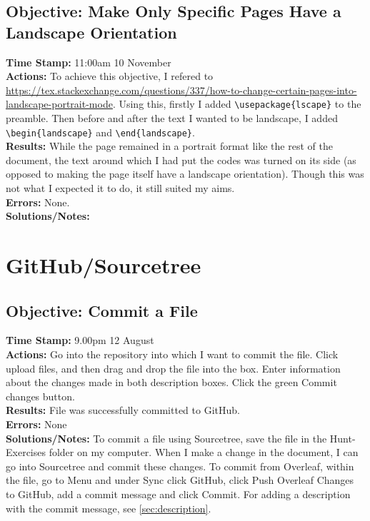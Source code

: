 \documentclass{article}
\begin{document}
\begin{FlushLeft}
\subsection{Objective: Make Only Specific Pages Have a Landscape Orientation}
\textbf{Time Stamp:} 11:00am 10 November\\
\textbf{Actions:} To achieve this objective, I refered to \url{https://tex.stackexchange.com/questions/337/how-to-change-certain-pages-into-landscape-portrait-mode}. Using this, firstly I added \verb|\usepackage{lscape}| to the preamble. Then before and after the text I wanted to be landscape, I added \verb|\begin{landscape}| and \verb|\end{landscape}|.\\
\textbf{Results:} While the page remained in a portrait format like the rest of the document, the text around which I had put the codes was turned on its side (as opposed to making the page itself have a landscape orientation). Though this was not what I expected it to do, it still suited my aims.\\
\textbf{Errors:} None.\\
\textbf{Solutions/Notes:} 



\pagebreak

\section{GitHub/Sourcetree}

\subsection{Objective: Commit a File}
\textbf{Time Stamp:} 9.00pm 12 August\\
\textbf{Actions:} Go into the repository into which I want to commit the file. Click upload files, and then drag and drop the file into the box. Enter information about the changes made in both description boxes. Click the green Commit changes button.\\
\textbf{Results:} File was successfully committed to GitHub.\\
\textbf{Errors:} None\\
\textbf{Solutions/Notes:} To commit a file using Sourcetree, save the file in the Hunt-Exercises folder on my computer. When I make a change in the document, I can go into Sourcetree and commit these changes. To commit from Overleaf, within the file, go to Menu and under Sync click GitHub, click Push Overleaf Changes to GitHub, add a commit message and click Commit. For adding a description with the commit message, see \autoref{sec:description}.


\end{FlushLeft}
\end{document}
